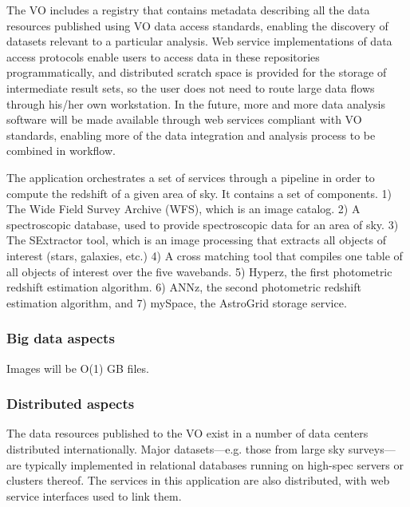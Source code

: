 The VO includes a registry that contains metadata describing all the data
resources published using VO data access standards, enabling the discovery of
datasets relevant to a particular analysis. Web service implementations of data
access protocols enable users to access data in these repositories
programmatically, and distributed scratch space is provided for the storage of
intermediate result sets, so the user does not need to route large data flows
through his/her own workstation. In the future, more and more data analysis
software will be made available through web services compliant with VO
standards, enabling more of the data integration and analysis process to be
combined in workflow.

The application orchestrates a set of services through a pipeline in order to compute the redshift of a given area of sky.  It contains a set of components.  1) The Wide Field Survey Archive (WFS), which is an image catalog. 2) A spectroscopic database, used to provide spectroscopic data for an area of sky. 3) The SExtractor tool, which is an image processing that extracts all objects of interest (stars, galaxies, etc.)  4) A cross matching tool that compiles one table of all objects of interest over the five wavebands.  5) Hyperz, the first photometric redshift estimation algorithm.  6) ANNz, the second photometric redshift estimation algorithm, and 7) mySpace, the AstroGrid storage service.

 \subsubsection*{Big data aspects}



Images will be O(1) GB files.

 \subsubsection*{Distributed aspects}


The data resources published to the VO exist in a number of data centers
distributed internationally. Major datasets---e.g. those from large sky
surveys---are typically implemented in relational databases running on high-spec servers
or clusters thereof.  The services in this application are also distributed, with web service interfaces used to link them.

